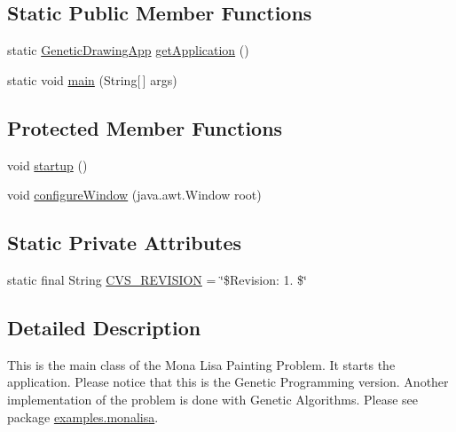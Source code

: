 \subsection*{Static Public Member Functions}
\begin{DoxyCompactItemize}
\item 
static \hyperlink{classexamples_1_1gp_1_1monalisa_1_1gui_1_1_genetic_drawing_app}{Genetic\-Drawing\-App} \hyperlink{classexamples_1_1gp_1_1monalisa_1_1gui_1_1_genetic_drawing_app_aa6f2ebf99ce940bf4cd761a81a4165a3}{get\-Application} ()
\item 
static void \hyperlink{classexamples_1_1gp_1_1monalisa_1_1gui_1_1_genetic_drawing_app_a71ffea06d02e2a38b4e1a188752374c6}{main} (String\mbox{[}$\,$\mbox{]} args)
\end{DoxyCompactItemize}
\subsection*{Protected Member Functions}
\begin{DoxyCompactItemize}
\item 
void \hyperlink{classexamples_1_1gp_1_1monalisa_1_1gui_1_1_genetic_drawing_app_a1db41d82d092213f03c97f0416dcb773}{startup} ()
\item 
void \hyperlink{classexamples_1_1gp_1_1monalisa_1_1gui_1_1_genetic_drawing_app_ac24cb320653786441ce0795d29269d53}{configure\-Window} (java.\-awt.\-Window root)
\end{DoxyCompactItemize}
\subsection*{Static Private Attributes}
\begin{DoxyCompactItemize}
\item 
static final String \hyperlink{classexamples_1_1gp_1_1monalisa_1_1gui_1_1_genetic_drawing_app_a6f24cad27f23b683767aec4cb34f43c8}{C\-V\-S\-\_\-\-R\-E\-V\-I\-S\-I\-O\-N} = \char`\"{}\$Revision\-: 1. \$\char`\"{}
\end{DoxyCompactItemize}


\subsection{Detailed Description}
This is the main class of the Mona Lisa Painting Problem. It starts the application. Please notice that this is the Genetic Programming version. Another implementation of the problem is done with Genetic Algorithms. Please see package \hyperlink{namespaceexamples_1_1monalisa}{examples.\-monalisa}.

